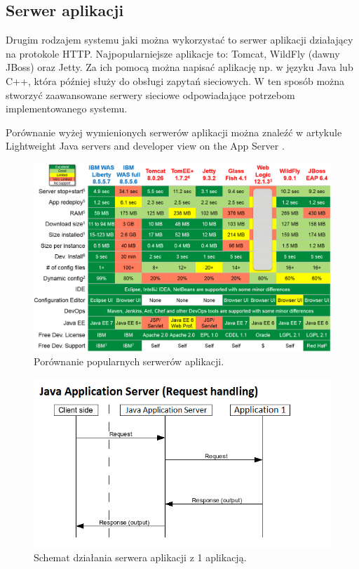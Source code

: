 \documentclass[eng]{mgr}
\begin{document}
			\subsection{Serwer aplikacji}
			Drugim rodzajem systemu jaki można wykorzystać to serwer aplikacji działający na protokole HTTP. Najpopularniejsze aplikacje \cite{mostpopularjavaservers} to: Tomcat, WildFly (dawny JBoss) oraz Jetty. Za ich pomocą można napisać aplikację np. w języku Java lub C++, która później służy do obsługi zapytań sieciowych. W ten sposób można stworzyć zaawansowane serwery sieciowe odpowiadające potrzebom implementowanego systemu.
		
			Porównanie wyżej wymienionych serwerów aplikacji można znaleźć w artykule Lightweight Java servers and developer view on the App Server \cite{javaserverscomparison}.
		
			\begin{center}
				\begin{figure}[ht]
					\centering
					\includegraphics[scale=0.55]{weblogic-jboss-wildfly-websphere-liberty-tomee-tomcat-glassfish-comparison1.png}
					\caption{Porównanie popularnych serwerów aplikacji. \cite{javaserverscomparison}}
				\end{figure}
			\end{center}
		
			\begin{center}
				\begin{figure}[ht]
					\centering
					\includegraphics[scale=0.8]{flow_jas.png}
					\caption{Schemat działania serwera aplikacji z 1 aplikacją.}
				\end{figure}
			\end{center}
	
\end{document}
